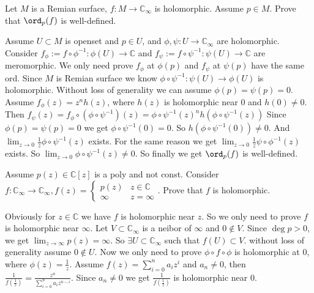 \documentclass{ctexart}
\begin{document}
\begin{problem}
Let \(M\) is a Remian surface, \(f:M \to \mathbb{C}_{\infty}\) is holomorphic. Assume \(p \in M\).
Prove that \(\ord_p(f)\) is well-defined.
\end{problem}

\begin{solution}
	Assume \(U \subset M\) is openset and \(p \in U\), and \(\phi,\psi:U \to \mathbb{C}_{\infty}\) are holomorphic.
	Consider \(f_\phi:=f \circ \phi^{-1}:\phi(U)\to \mathbb{C}\) and \(f_\psi:=f \circ \psi^{-1}:\psi(U) \to \mathbb{C}\) are meromorphic.
	We only need prove \(f_\phi\) at \(\phi(p)\) and \(f_\psi\) at \(\psi(p)\) have the same ord.
	Since \(M\) is Remian surface we know \(\phi \circ \psi^{-1}:\psi(U)\to \phi(U)\) is holomorphic.
	Without loss of generality we can assume \(\phi(p)=\psi(p)=0\).
	Assume \(f_\phi(z)=z^nh(z)\), where \(h(z)\) is holomorphic near \(0\) and \(h(0)\neq 0\).
	Then \(f_\psi(z)=f_{\phi}\circ (\phi \circ \psi^{-1})(z)=\phi \circ \psi^{-1} (z)^n h(\phi \circ \psi^{-1}(z))\)
	Since \(\phi(p)=\psi(p)=0\) we get \(\phi \circ \psi^{-1}(0)=0\). So \(h(\phi \circ \psi^{-1}(0)) \neq 0\).
	And \(\lim_{z \to 0}\frac{1}{z}\phi \circ \psi^{-1}(z)\) exists.
	For the same reason we get \(\lim_{z \to 0}\frac{1}{z}\psi \circ \phi^{-1}(z)\) exists.
	So \(\lim_{z \to 0}\phi \circ \psi^{-1}(z)\neq 0\).
	So finally we get \(\ord_p(f)\) is well-defined.
\end{solution}

\begin{problem}
Assume \(p(z)\in \mathbb{C}[z]\) is a poly and not const.
Consider \(f:\mathbb{C}_{\infty}\to \mathbb{C}_{\infty},f(z)= \begin{cases}
	p(z)   & z \in \mathbb{C} \\
	\infty & z=\infty
\end{cases}\).
Prove that \(f\) is holomorphic.
\end{problem}

\begin{solution}
	Obviously for \(z \in \mathbb{C}\) we have \(f\) is holomorphic near \(z\). So we only need to prove \(f\) is holomorphic near \(\infty\).
	Let \(V \subset \mathbb{C}_{\infty}\) is a neibor of \(\infty\) and \(0 \notin V\).
	Since \(\deg p>0\), we get \(\lim_{z \to \infty}p(z)=\infty\).
	So \(\exists U \subset \mathbb{C}_{\infty}\) such that \(f(U)\subset V\). without loss of generality assume \(0 \notin U\).
	Now we only need to prove \(\phi \circ f \circ \phi\) is holomorphic at \(0\), where \(\phi(z)=\frac{1}{z}\).
	Assume \(f(z)=\sum_{i=0}^n a_i z^i\) and \(a_n \neq 0\), then \(\frac{1}{f(\frac{1}{z})}=\frac{z^n}{\sum_{i=0}^n a_i z^{n-i}}\).
	Since \(a_n \neq 0\) we get \(\frac{1}{f(\frac{1}{z})}\) is holomorphic near \(0\).
\end{solution}
\end{document}
